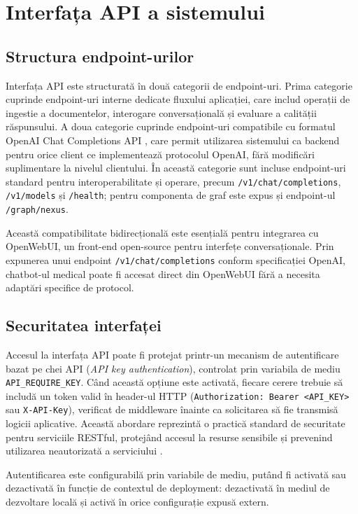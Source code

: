 \documentclass[12pt, a4paper, oneside, romanian]{teza-upb}
\begin{document}
\section{Interfața API a sistemului}

\subsection{Structura endpoint-urilor}

Interfața API este structurată în două categorii de endpoint-uri. Prima categorie cuprinde endpoint-uri interne dedicate fluxului aplicației, care includ operații de ingestie a documentelor, interogare conversațională și evaluare a calității răspunsului. A doua categorie cuprinde endpoint-uri compatibile cu formatul OpenAI Chat Completions API \cite{openai_api}, care permit utilizarea sistemului ca backend pentru orice client ce implementează protocolul OpenAI, fără modificări suplimentare la nivelul clientului. În această categorie sunt incluse endpoint-uri standard pentru interoperabilitate și operare, precum \texttt{/v1/chat/completions}, \texttt{/v1/models} și \texttt{/health}; pentru componenta de graf este expus și endpoint-ul \texttt{/graph/nexus}.

Această compatibilitate bidirecțională este esențială pentru integrarea cu OpenWebUI, un front-end open-source pentru interfețe conversaționale. Prin expunerea unui endpoint \texttt{/v1/chat/completions} conform specificației OpenAI, chatbot-ul medical poate fi accesat direct din OpenWebUI fără a necesita adaptări specifice de protocol.

\subsection{Securitatea interfaței}

Accesul la interfața API poate fi protejat printr-un mecanism de autentificare bazat pe chei API (\textit{API key authentication}), controlat prin variabila de mediu \texttt{API\_REQUIRE\_KEY}. Când această opțiune este activată, fiecare cerere trebuie să includă un token valid în header-ul HTTP (\texttt{Authorization: Bearer <API\_KEY>} sau \texttt{X-API-Key}), verificat de middleware înainte ca solicitarea să fie transmisă logicii aplicative. Această abordare reprezintă o practică standard de securitate pentru serviciile RESTful, protejând accesul la resurse sensibile și prevenind utilizarea neautorizată a serviciului \cite{flask_doc}.

Autentificarea este configurabilă prin variabile de mediu, putând fi 
activată sau dezactivată în funcție de contextul de deployment: 
dezactivată în mediul de dezvoltare locală și activă în orice 
configurație expusă extern.
\end{document}
